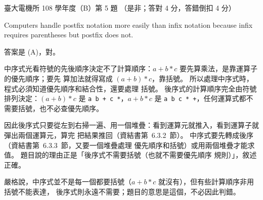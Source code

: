 \begin{pastexam}[label={px:ntu-108-ee-dsb-05}]{臺大電機所 108 學年度（B）第 5 題}
（是非；答對 4 分，答錯倒扣 4 分）

Computers handle postfix notation more easily than infix notation because infix requires
parentheses but postfix does not.
\end{pastexam}

\begin{pastsoln}
答案是 (A)，對。

中序式光看符號的先後順序決定不了計算順序：$a + b * c$ 要先算乘法，是靠運算子的優先順序；要先
算加法就得寫成 $(a + b) * c$，靠括號。 所以處理中序式時，程式必須知道優先順序和結合性，還要處理
括號。 後序式的計算順序完全由符號排列決定：$(a + b) * c$ 是 \texttt{a b + c *}，$a + b * c$ 是
\texttt{a b c * +}，任何運算式都不需要括號，也不必查優先順序。

因此後序式只要從左到右掃一遍、用一個堆疊：看到運算元就推入，看到運算子就彈出兩個運算元，算完
把結果推回（資結書第~6.3.2~節）。 中序式要先轉成後序（資結書第~6.3.3~節，又要一個堆疊處理
優先順序和括號）或用兩個堆疊才能求值。 題目說的理由正是「後序式不需要括號（也就不需要優先順序
規則）」，敘述正確。

嚴格說，中序式並不是每一個都要括號（$a + b * c$ 就沒有），但有些計算順序非用括號不能表達，
後序式則永遠不需要；題目的意思是這個，不必因此判錯。
\end{pastsoln}
